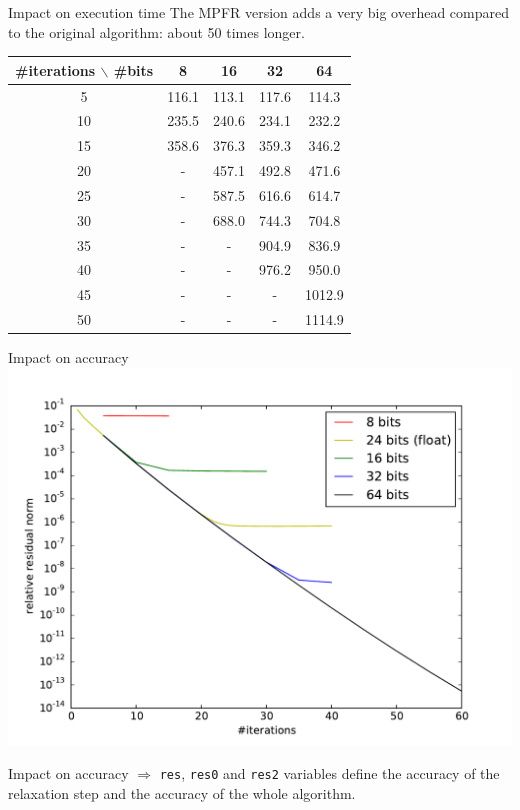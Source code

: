 \documentclass{beamer}
\begin{document}
\begin{frame}{Impact on execution time}
 The MPFR version adds a very big overhead compared to the original algorithm: about 50 times longer.
 \begin{tabular}{|c|c|c|c|c|}
  \hline
  \#iterations $\backslash$ \#bits & 8 & 16 & 32 & 64 \\
  \hline
  5 & 116.1 & 113.1 & 117.6 & 114.3\\
  \hline
  10 & 235.5 & 240.6 & 234.1 & 232.2\\
  \hline
  15 & 358.6 & 376.3 & 359.3 & 346.2\\
  \hline
  20 & - & 457.1 & 492.8 & 471.6 \\
  \hline
  25 & - & 587.5 & 616.6 & 614.7 \\
  \hline
  30 & - & 688.0 & 744.3 & 704.8 \\
  \hline
  35 & - & - & 904.9 & 836.9\\
  \hline
  40 & - & - & 976.2 & 950.0 \\
  \hline
  45 & - & - & - & 1012.9\\
  \hline
  50 & - & - & - & 1114.9\\
  \hline
 \end{tabular}

\end{frame}

\begin{frame}{Impact on accuracy}
  \includegraphics[width=\linewidth]{AMG2006/test/MPFR/bits_convergence.pdf}
\end{frame}

\begin{frame}{Impact on accuracy}
  $\Rightarrow$ \texttt{res}, \texttt{res0} and \texttt{res2} variables define the accuracy of the relaxation step and the accuracy of the whole algorithm.
\end{frame}
\end{document}
